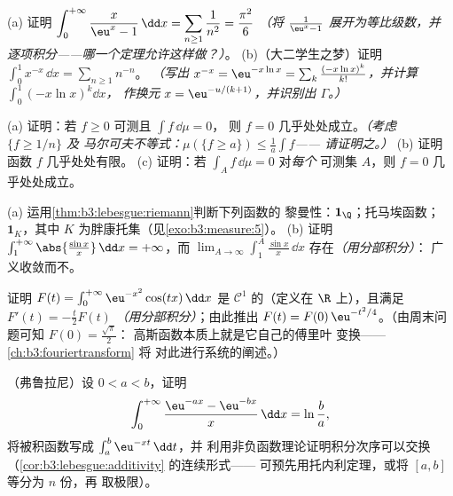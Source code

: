 \begin{exercise}[$\star\star$]\label{exo:b3:lebesgue:4}
(a) 证明 $\displaystyle\int_0^{+\infty}\frac{x}{\eu^x -
1}\,\dd x = \sum_{n\geq1}\frac1{n^2} = \frac{\pi^2}6$
\emph{（将 $\frac1{\eu^x - 1}$ 展开为等比级数，并
逐项积分——哪一个定理允许这样做？）}。
(b)（大二学生之梦）证明
$\displaystyle\int_0^1 x^{-x}\,\dd x = \sum_{n\geq1}n^{-n}$。
\emph{（写出 $x^{-x} = \eu^{-x\ln x} = \sum_k\frac{(-x\ln
x)^k}{k!}$，并计算 $\int_0^1(-x\ln x)^k\dd x$，
作换元 $x = \eu^{-u/(k+1)}$，并识别出 $\Gamma$。）}
\end{exercise}

\begin{exercise}[$\star\star$]\label{exo:b3:lebesgue:5}
(a) 证明：若 $f \geq 0$ 可测且 $\int f\,\dd\mu = 0$，
则 $f = 0$ 几乎处处成立。\emph{（考虑 $\{f \geq 1/n\}$ 及
马尔可夫不等式：$\mu(\{f \geq a\}) \leq \frac1a\int f$——
请证明之。）}
(b) 证明函数 $f$ 几乎处处有限。
(c) 证明：若 $\int_A f\,\dd\mu = 0$ 对\emph{每个}
可测集 $A$，则 $f = 0$ 几乎处处成立。
\end{exercise}

\begin{exercise}[$\star\star$]\label{exo:b3:lebesgue:6}
(a) 运用\cref{thm:b3:lebesgue:riemann}判断下列函数的
黎曼性：$\mathbf 1_\Q$；托马埃函数；$\mathbf
1_K$，其中 $K$ 为胖康托集（见\cref{exo:b3:measure:5}）。
(b) 证明 $\int_1^{+\infty}\abs{\frac{\sin x}x}\,\dd x =
+\infty$，而 $\lim_{A\to\infty}\int_1^A\frac{\sin
x}x\,\dd x$ 存在\emph{（用分部积分）}：
广义收敛而不。
\end{exercise}

\begin{exercise}[$\star\star$]\label{exo:b3:lebesgue:7}
证明 $F(t) = \int_0^{+\infty}\eu^{-x^2}\cos(tx)\,\dd x$
是 $\mathcal C^1$ 的（定义在 $\R$ 上），且满足 $F'(t) = -\frac t2F(t)$
\emph{（用分部积分）}；由此推出 $F(t) =
F(0)\,\eu^{-t^2/4}$。（由周末问题可知 $F(0) = \frac{\sqrt\pi}2$：
高斯函数本质上就是它自己的傅里叶
变换——\cref{ch:b3:fouriertransform} 将
对此进行系统的阐述。）
\end{exercise}

\begin{exercise}[$\star\star\star$]\label{exo:b3:lebesgue:8}
（弗鲁拉尼）设 $0 < a < b$，证明
\[
\int_0^{+\infty}\frac{\eu^{-ax} - \eu^{-bx}}{x}\,\dd x =
\ln\frac ba,
\]
将被积函数写成 $\int_a^b \eu^{-xt}\,\dd t$，并
利用非负函数理论证明积分次序可以交换
（\cref{cor:b3:lebesgue:additivity} 的连续形式——
可预先用托内利定理，或将 $[a,b]$ 等分为 $n$ 份，再
取极限）。
\end{exercise}

